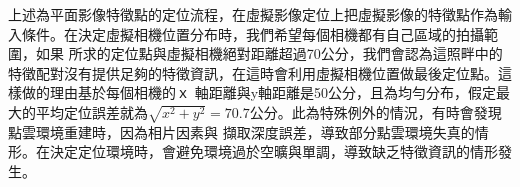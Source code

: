     上述為平面影像特徵點的定位流程，在虛擬影像定位上把虛擬影像的特徵點作為輸入條件。在決定虛擬相機位置分布時，我們希望每個相機都有自己區域的拍攝範圍，如果
    所求的定位點與虛擬相機絕對距離超過70公分，我們會認為這照畔中的特徵配對沒有提供足夠的特徵資訊，在這時會利用虛擬相機位置做最後定位點。這樣做的理由基於每個相機的ｘ
    軸距離與y軸距離是50公分，且為均勻分布，假定最大的平均定位誤差就為$\sqrt{x^2+y^2}=70.7$公分。此為特殊例外的情況，有時會發現點雲環境重建時，因為相片因素與
 	擷取深度誤差，導致部分點雲環境失真的情形。在決定定位環境時，會避免環境過於空曠與單調，導致缺乏特徵資訊的情形發生。

